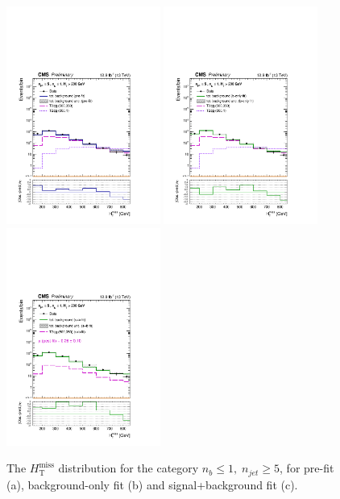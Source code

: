 \clearpage
\begin{figure}[tbhp]
    \caption{ 
    The $H_{\mathrm{T}}^{\mathrm{miss}}$ distribution for the category $n_{b}\leq 1, \; n_{jet} \geq 5$, for pre-fit (a), background-only fit (b) and signal+background fit (c).
    \label{fig:mhtShape_le1b_ge5j} }
  \begin{center}
  \includegraphics[width=0.45\textwidth]{mhtShape_le1b_ge5j_200_Inf_prefit_aux} \hspace{1cm}
  \includegraphics[width=0.45\textwidth]{mhtShape_le1b_ge5j_200_Inf_fit_b_aux} \\
  \includegraphics[width=0.45\textwidth]{mhtShape_le1b_ge5j_200_Inf_fit_s_aux}
  \end{center}
\end{figure}


